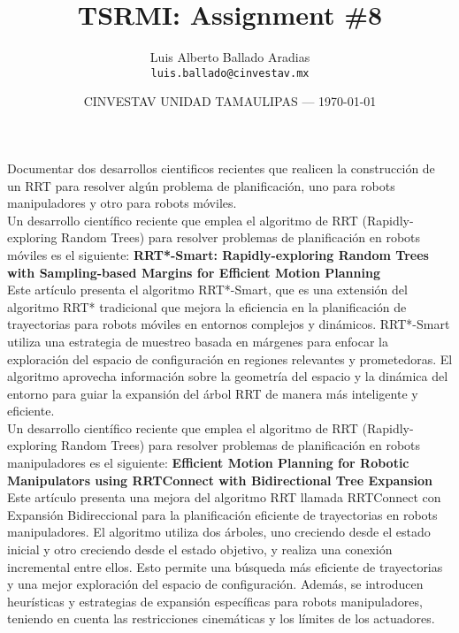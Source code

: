 \documentclass{article}
\title{TSRMI: Assignment \#8} %
\author{Luis Alberto Ballado Aradias\\ \texttt{luis.ballado@cinvestav.mx}} %
\date{CINVESTAV UNIDAD TAMAULIPAS --- \today} %
\begin{document}
\maketitle %


Documentar dos desarrollos cientificos recientes que realicen la construcción de un RRT para resolver algún problema de planificación, uno para robots manipuladores y otro para robots móviles.\\

Un desarrollo científico reciente que emplea el algoritmo de RRT (Rapidly-exploring Random Trees) para resolver problemas de planificación en robots móviles es el siguiente: \textbf{RRT*-Smart: Rapidly-exploring Random Trees with Sampling-based Margins for Efficient Motion Planning}\\

Este artículo presenta el algoritmo RRT*-Smart, que es una extensión del algoritmo RRT* tradicional que mejora la eficiencia en la planificación de trayectorias para robots móviles en entornos complejos y dinámicos. RRT*-Smart utiliza una estrategia de muestreo basada en márgenes para enfocar la exploración del espacio de configuración en regiones relevantes y prometedoras. El algoritmo aprovecha información sobre la geometría del espacio y la dinámica del entorno para guiar la expansión del árbol RRT de manera más inteligente y eficiente.\\

Un desarrollo científico reciente que emplea el algoritmo de RRT (Rapidly-exploring Random Trees) para resolver problemas de planificación en robots manipuladores es el siguiente: \textbf{Efficient Motion Planning for Robotic Manipulators using RRTConnect with Bidirectional Tree Expansion}\\

Este artículo presenta una mejora del algoritmo RRT llamada RRTConnect con Expansión Bidireccional para la planificación eficiente de trayectorias en robots manipuladores. El algoritmo utiliza dos árboles, uno creciendo desde el estado inicial y otro creciendo desde el estado objetivo, y realiza una conexión incremental entre ellos. Esto permite una búsqueda más eficiente de trayectorias y una mejor exploración del espacio de configuración. Además, se introducen heurísticas y estrategias de expansión específicas para robots manipuladores, teniendo en cuenta las restricciones cinemáticas y los límites de los actuadores.
\end{document}
